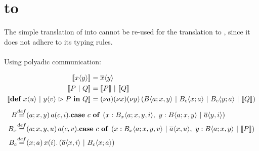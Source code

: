 \section{\MonadicJoinCalc to \ActorPiCalc}

The simple translation of \joincalc into \asyncpicalc \cite{fournet_reflexive_1996} cannot be re-used for the translation to \actorpicalc,
since it does not adhere to its typing rules.
\\
\\
Using polyadic communication:

\begin{align}
  \begin{split}
    \encMJtoAP{\jsnd{x}{y}}
    &= \asnd{x}{y} \\
    \encMJtoAP{P \jpar Q}
    &= \encMJtoAP{P} \apar \encMJtoAP{Q} \\
    \encMJtoAP{\jdef{\jrct{\jrcv{x}{u} \jpat \jrcv{y}{v}}{P}}{Q}}
    &= \anew{a}{\anew{x}{\anew*{y}{ \ains{B}{a}{x,y} \apar \ains{B_c}{x}{a} \apar \ains{B_c}{y}{a} \apar \encMJtoAP{Q}}}} \\
  \end{split}
\end{align}
\begin{align}
  \begin{split}
       \adef*{B}{a}{x,y}{
         \arcv{a}{c,i} . \acse{c}{
            \aalt{x}{\ains{B_x}{a}{x,y,i}},\ 
            \aalt{y}{\ains{B}{a}{x,y} \apar \asnd{a}{y,i}}
          }
       } \\
       \adef*{B_x}{a}{x,y,u}{
         \arcv{a}{c,v} . \acse{c}{
           \aalt{x}{\ains{B_x}{a}{x,y,v} \apar \asnd{a}{x,u}},\ 
           \aalt{y}{\ains{B}{a}{x,y} \apar \encMJtoAP{P}}
         } \\
       }
       \adef*{B_c}{x}{a}{
         \arcv{x}{i} . \parens{\asnd{a}{x,i} \apar \ains{B_c}{x}{a}}
       } \\
  \end{split}
\end{align}
